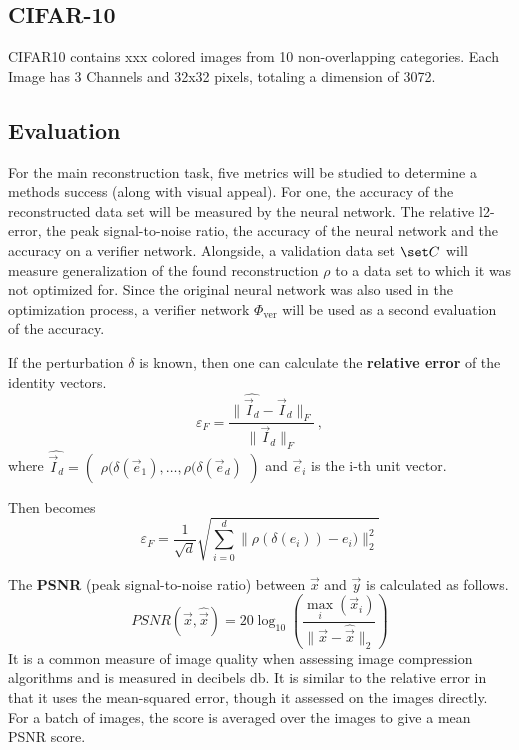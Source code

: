 \subsection{CIFAR-10}
CIFAR10 contains xxx colored images from 10 non-overlapping categories.
Each Image has 3 Channels and 32x32 pixels, totaling a dimension of 3072.



\subsection{Evaluation}




For the main reconstruction task, 
five metrics will be studied to determine a methods success (along with visual appeal).
For one, the accuracy of the reconstructed data set will be measured by the neural network.
The relative l2-error, the peak signal-to-noise ratio, the accuracy of the neural network and the accuracy on a verifier network.
Alongside, a validation data set $\set C$ will measure generalization of the found reconstruction $\rho$ to a data set to which it was not optimized for.
Since the original neural network was also used in the optimization process, a verifier network $\Phi_{\text{ver}}$ will be used as a second evaluation of the accuracy.

If the perturbation $\delta$ is known, then one can calculate the \textbf{relative error} of the identity vectors. 
\begin{equation}
\label{eqn:relerror}
    \varepsilon_F = \frac {\|\widehat {\vec I_d} - \vec I_d\|_F} {\|\vec I_d\|_F} \,,
\end{equation}
where $\widehat {\vec I_d} = \begin{pmatrix} \rho (\delta (\vec e_1), \dots, \rho (\delta (\vec e_d) \end{pmatrix}$ and $\vec e_i$ is the i-th unit vector.

Then  becomes
\[
    \varepsilon_F = \frac 1 {\sqrt d} \sqrt{ \sum_{i=0}^d \|\rho (\delta (e_i)) - e_i)\|_2^2}
\]

The \textbf{PSNR} (peak signal-to-noise ratio) between $\vec x$ and $\vec y$ is calculated as follows.
\[
    PSNR(\vec x, \hat {\vec x}) = 20 \log_{10} \left (\frac {\max_i(\vec x_i)} {\|\vec x-\hat {\vec x}\|_2} \right )
\]
It is a common measure of image quality when assessing image compression algorithms and is measured in decibels db.
It is similar to the relative error in that it uses the mean-squared error, though it assessed on the images directly.
For a batch of images, the score is averaged over the images to give a mean PSNR score.

